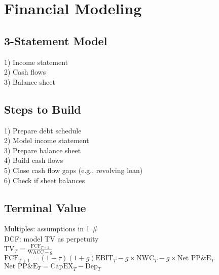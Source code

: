 \section{Financial Modeling}
	\subsection*{3-Statement Model}
	1) Income statement\\
	2) Cash flows\\
	3) Balance sheet
	
	\subsection*{Steps to Build}
	1) Prepare debt schedule\\
	2) Model income statement\\
	3) Prepare balance sheet\\
	4) Build cash flows\\
	5) Close cash flow gaps (e.g., revolving loan)\\
	6) Check if sheet balances
	
	\subsection*{Terminal Value}
	Multiples: assumptions in 1 \#\\
	DCF: model TV as perpetuity\\
	$\text{TV}_{T} = \frac{\text{FCF}_{T+1}}{\text{WACC} - g}$\\
	$\text{FCF}_{T+1} = \left(1 - \tau\right)\left(1 + g\right)\text{EBIT}_{T} - g\times\text{NWC}_{T} - g\times\text{Net PP\&E}_{T}$\\
	$\text{Net PP\&E}_{T} = \text{CapEX}_{T} - \text{Dep}_{T}$
	